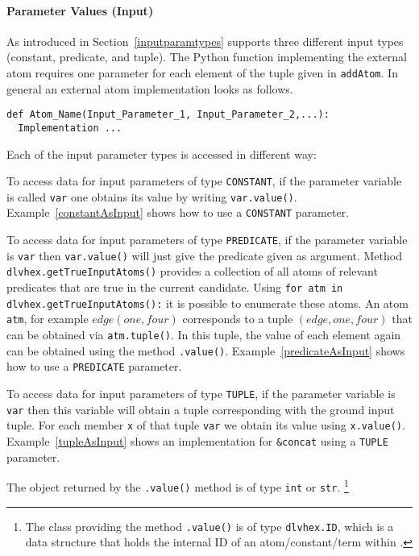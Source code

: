 \documentclass[a4paper, titlepage]{article}
\newcommand{\mi}[1]{\mathit{#1}}
\begin{document}
\paragraph{Parameter Values (Input)}
As introduced in Section~\ref{inputparamtypes}
\dlvhex{} supports three different input types
(constant, predicate, and tuple).
The Python function implementing the external atom
requires one parameter for each element of the tuple given in \verb|addAtom|.
In general an external atom implementation looks as follows.
\begin{verbatim}
def Atom_Name(Input_Parameter_1, Input_Parameter_2,...):
  Implementation ...
\end{verbatim}
Each of the input parameter types is accessed in different way: 
\begin{compactitem}
\item
  To access data for input parameters of type \verb+CONSTANT+,
  if the parameter variable is called \verb+var+
  one obtains its value by writing \verb+var.value()+.
  Example~\ref{constantAsInput} shows how to use a \verb+CONSTANT+ parameter.
\item
  To access data for input parameters of type \verb+PREDICATE+,
  if the parameter variable is \verb+var+
  then \verb+var.value()+ will just give the predicate given as argument.
  Method \verb+dlvhex.getTrueInputAtoms()+ provides a collection
  of all atoms of relevant predicates that are true in the current candidate.
  Using \verb+for atm in dlvhex.getTrueInputAtoms():+
  it is possible to enumerate these atoms.
  An atom \verb+atm+, for example $\mi{edge}(\mi{one},\mi{four})$
  corresponds to a tuple $(\mi{edge},\mi{one},\mi{four})$
  that can be obtained via \verb+atm.tuple()+.
  In this tuple, the value of each element again can be obtained
  using the method \verb+.value()+.
  Example~\ref{predicateAsInput} shows how to use a \verb+PREDICATE+ parameter.
\item
  To access data for input parameters of type \verb+TUPLE+,
  if the parameter variable is \verb+var+ then
  this variable will obtain a tuple corresponding with the ground input tuple.
  For each member \verb+x+ of that tuple \verb+var+
  we obtain its value using \verb+x.value()+.
  Example~\ref{tupleAsInput} shows an implementation for \verb|&concat|
  using a \verb+TUPLE+ parameter.
\end{compactitem}
%
The object returned by the \verb+.value()+ method
is of type \verb|int| or \verb|str|.%
\footnote{The class providing the method \texttt{.value()}
  is of type \texttt{dlvhex.ID}, which is a data structure
  that holds the internal ID of an atom/constant/term within \dlvhex.}
\end{document}
